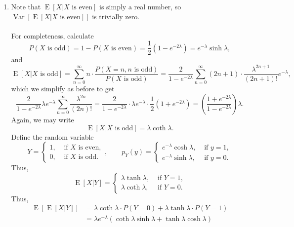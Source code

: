 \documentclass[10pt]{article}
\newcommand\op[1]{\operatorname{#1}}
\newcommand\E[1]{\op{E}[#1]}
\newcommand\V[1]{\op{Var}[#1]}
\begin{document}
\begin{enumerate}
            \item Note that $\E{X|X\text{ is even}}$ is simply a real number, so
            $\V{\E{X|X\text{ is even}}}$ is trivially zero. \\~\\

            For completeness, calculate \[
                P(X\text{ is odd}) = 1 - P(X\text{ is even}) = \frac{1}{2}(1 -
                e^{-2\lambda}) = e^{-\lambda}\sinh{\lambda},
            \] and \[
                \E{X|X\text{ is odd}} = \sum_{n = 0}^\infty n\cdot \frac{P(X = n,
                n\text{ is odd})}{P(X\text{ is odd})} = \frac{2}{1 -
                e^{-2\lambda}}\sum_{n = 0}^\infty (2n + 1)\cdot
                \frac{\lambda^{2n + 1}}{(2n + 1)!}e^{-\lambda},
            \] which we simplify as before to get \[
                \frac{2}{1 - e^{-2\lambda}}\lambda e^{-\lambda}\sum_{n = 0}^\infty
                \frac{\lambda^{2n}}{(2n)!} = \frac{2}{1 - e^{-2\lambda}}\cdot\lambda
                e^{-\lambda}\cdot \frac{1}{2}(1 + e^{-2\lambda}) = \left(\frac{1 +
                e^{-2\lambda}}{1 - e^{-2\lambda}}\right)\lambda.
            \] Again, we may write \[
                \E{X|X\text{ is odd}} = \lambda\coth{\lambda}.
            \] Define the random variable \[
                Y = \begin{cases}
                    1, &\text{ if }X\text{ is even}, \\
                    0, &\text{ if }X\text{ is odd}.
                \end{cases}, \qquad
                p_Y(y) = \begin{cases}
                    e^{-\lambda}\cosh{\lambda}, &\text{ if }y = 1, \\
                    e^{-\lambda}\sinh{\lambda}, &\text{ if }y = 0.
                \end{cases}
            \] Thus, \[
                \E{X|Y} = \begin{cases}
                    \lambda\tanh{\lambda}, &\text{ if }Y = 1,\\
                    \lambda\coth{\lambda}, &\text{ if }Y = 0.
                \end{cases}
            \] Thus, \begin{align*}
                \E{\E{X|Y}} &= \lambda\coth{\lambda}\cdot P(Y = 0) +
                \lambda\tanh{\lambda}\cdot P(Y = 1) \\
                &= \lambda e^{-\lambda}\left(\coth{\lambda}\sinh{\lambda} +
                \tanh{\lambda}\cosh{\lambda}\right) \\

\end{align*}
\end{enumerate}
\end{document}
